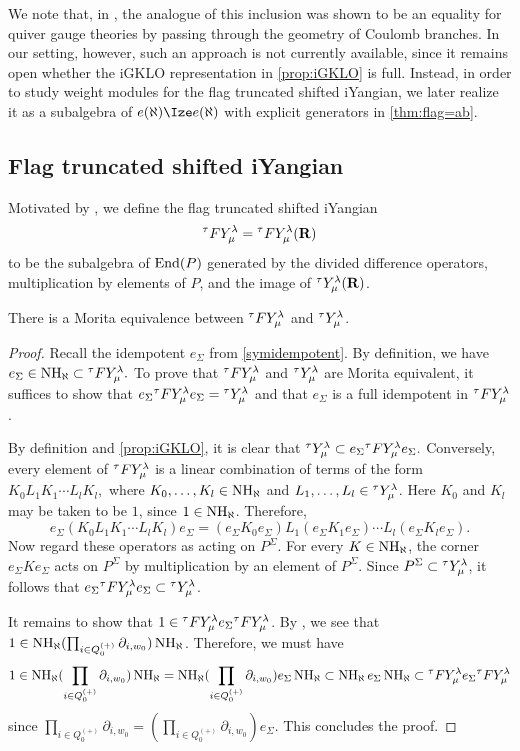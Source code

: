\begin{remark}
We note that, in \cite[Theorem~4.22]{KTWWY19}, the analogue of this inclusion was shown to be an equality for quiver gauge theories by passing through the geometry of Coulomb branches.  
In our setting, however, such an approach is not currently available, since it remains open whether the iGKLO representation in \cref{prop:iGKLO} is full.  
Instead, in order to study weight modules for the flag truncated shifted iYangian, we later realize it as a subalgebra of $e(\aleph)\tR e(\aleph)$ with explicit generators in \cref{thm:flag=ab}.
\end{remark}


\subsection{Flag truncated shifted iYangian}

Motivated by \cite[\S 4.3]{KTWWY19}, we define the flag truncated shifted iYangian
\[
{}^\tau FY^\lambda_\mu = {}^\tau FY^\lambda_\mu(\mathbf{R})
\]
to be the subalgebra of $\operatorname{End}(P)$ generated by the divided difference operators, multiplication by elements of $P$, and the image of ${}^\tau Y^\lambda_\mu(\mathbf{R})$.  

\begin{theorem}
\label{thm:morita}
    There is a Morita equivalence between ${}^\tau F Y_\mu^\lambda$ and ${}^\tau Y_\mu^\lambda$.
\end{theorem}

\begin{proof}
Recall the idempotent $e_{\Sigma}$ from \cref{symidempotent}. By definition, we have
\(
e_{\Sigma} \in \operatorname{NH}_\aleph \subset {}^\tau F Y_\mu^\lambda.
\)
To prove that ${}^\tau F Y_\mu^\lambda$ and ${}^\tau Y_\mu^\lambda$ are Morita equivalent, it suffices to show that
\(
e_{\Sigma} {}^\tau F Y_\mu^\lambda e_{\Sigma} = {}^\tau Y_\mu^\lambda
\)
and that $e_{\Sigma}$ is a full idempotent in ${}^\tau F Y_\mu^\lambda$.

By definition and \cref{prop:iGKLO}, it is clear that
\(
{}^\tau Y_\mu^\lambda \subset e_{\Sigma} {}^\tau F Y_\mu^\lambda e_{\Sigma}.
\)
Conversely, every element of ${}^\tau F Y_\mu^\lambda$ is a linear combination of terms of the form
\(
K_0 L_1 K_1 \cdots L_l K_l,
\)
where $K_0,\dots,K_l \in \operatorname{NH}_\aleph$ and $L_1,\dots,L_l \in {}^\tau Y_\mu^\lambda$.
Here $K_0$ and $K_l$ may be taken to be $1$, since \(1\in \operatorname{NH}_\aleph\).
Therefore,
\[
e_{\Sigma} (K_0L_1K_1\cdots L_l K_l)e_{\Sigma}
=
(e_{\Sigma} K_0 e_{\Sigma})L_1(e_{\Sigma} K_1 e_{\Sigma})\cdots L_l(e_{\Sigma} K_l e_{\Sigma}).
\] Now regard these operators as acting on $P^\Sigma$. For every $K\in\operatorname{NH}_\aleph$, the corner $e_\Sigma K e_\Sigma$ acts on
$P^\Sigma$ by multiplication by an element of $P^\Sigma$.
Since $P^\Sigma\subset{}^\tau Y_\mu^\lambda$, it follows that $e_{\Sigma} {}^\tau F Y_\mu^\lambda e_{\Sigma}\subset {}^\tau Y_\mu^\lambda$.

It remains to show that $1\in {}^\tau F Y_\mu^\lambda e_{\Sigma} {}^\tau F Y_\mu^\lambda$. By \cite[Lemma 2.12]{We19}, we see that $1\in \operatorname{NH}_\aleph (\prod_{i\in Q_0^{(+)}} \partial_{i,w_0}) \operatorname{NH}_\aleph$. Therefore, we must have
\[
1\in \operatorname{NH}_\aleph (\prod_{i\in Q_0^{(+)}} \partial_{i,w_0}) \operatorname{NH}_\aleph =\operatorname{NH}_\aleph  (\prod_{i\in Q_0^{(+)}} \partial_{i,w_0}) e_{\Sigma} \operatorname{NH}_\aleph\subset \operatorname{NH}_\aleph e_{\Sigma} \operatorname{NH}_\aleph \subset {}^\tau F Y_\mu^\lambda e_{\Sigma} {}^\tau F Y_\mu^\lambda
\]
since $\prod_{i\in Q_0^{(+)}} \partial_{i,w_0}= (\prod_{i\in Q_0^{(+)}} \partial_{i,w_0})e_{\Sigma} $. This concludes the proof.
\end{proof}



